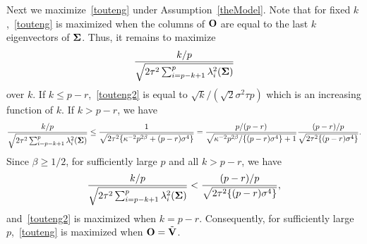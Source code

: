 \documentclass[times,sort&compress,3p]{elsarticle}
\theoremstyle{plain}
\theoremstyle{definition}
\theoremstyle{remark}
\begin{document}
Next we maximize~\eqref{touteng} under Assumption~\ref{theModel}. Note that for fixed $k$,~\eqref{touteng} is maximized when the columns of $\mathbf{O}$ are equal to the last $k$ eigenvectors of $\boldsymbol{\Sigma}$.
Thus, it remains to maximize
\begin{equation}\label{touteng2}
\frac{k/p}{\sqrt{2\tau^2\sum_{i=p-k+1}^p \lambda_i^2 (\boldsymbol{\Sigma})}}
\end{equation}
over $k$.
If $k\leq p-r$,~\eqref{touteng2} is equal to $\sqrt{k}/(\sqrt{2} \sigma^2 \tau p)$ which is an increasing function of $k$.
If $k> p-r$, we have
\begin{equation*}
        \frac{k/p}{\sqrt{2\tau^2\sum_{i=p-k+1}^p \lambda_i^2(\boldsymbol{\Sigma})}}
        \leq
        \frac{1}{\sqrt{2\tau^2\{\kappa^{-2}p^{2\beta}+(p-r)\sigma^4\} }}
        =
        \frac{p/(p-r)}{\sqrt{\kappa^{-2}p^{2\beta}/\{(p-r)\sigma^4\}+1}}
        \frac{(p-r)/p}{\sqrt{2\tau^2 \{(p-r)\sigma^4 \} }}.
\end{equation*}
Since $\beta\geq 1/2$, for sufficiently large $p$ and all $k>p-r$, we have
\begin{equation*}
        \frac{k/p}{\sqrt{2\tau^2\sum_{i=p-k+1}^p \lambda_i^2(\boldsymbol{\Sigma})}}
        <
        \frac{(p-r)/p}{\sqrt{2\tau^2 \{(p-r)\sigma^4\} }},
\end{equation*}
and~\eqref{touteng2} is maximized when $k=p-r$.
Consequently, for sufficiently large $p$,~\eqref{touteng} is maximized when $\mathbf{O}=\tilde{\mathbf{V}}$.
\end{document}
